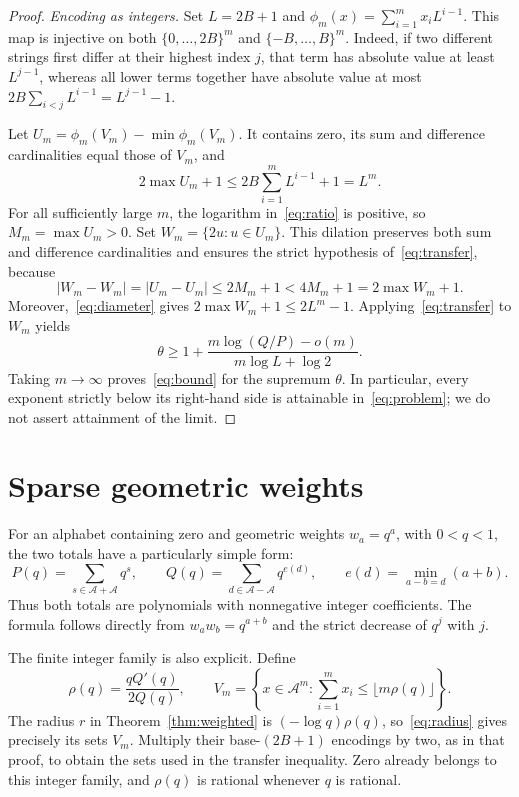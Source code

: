 \documentclass[11pt,a4paper]{article}
\newcommand{\A}{\mathcal A}
\begin{document}
\begin{proof}
\smallskip\noindent\emph{Encoding as integers.}
Set $L=2B+1$ and
$\phi_m(x)=\sum_{i=1}^m x_iL^{i-1}$. This map is injective on both
$\{0,\ldots,2B\}^m$ and $\{-B,\ldots,B\}^m$.
Indeed, if two different strings first differ at their highest index $j$,
that term has absolute value at least $L^{j-1}$, whereas all lower terms
together have absolute value at most
$2B\sum_{i<j}L^{i-1}=L^{j-1}-1$.

Let $U_m=\phi_m(V_m)-\min\phi_m(V_m)$. It contains zero, its sum and
difference cardinalities equal those of $V_m$, and
\begin{equation}\label{eq:diameter}
 2\max U_m+1
 \le 2B\sum_{i=1}^m L^{i-1}+1
 =L^m.
\end{equation}
For all sufficiently large $m$, the logarithm in~\eqref{eq:ratio} is
positive, so $M_m=\max U_m>0$. Set $W_m=\{2u:u\in U_m\}$.
This dilation preserves both sum and difference cardinalities and ensures
the strict hypothesis of~\eqref{eq:transfer}, because
\[
 |W_m-W_m|=|U_m-U_m|
 \le2M_m+1<4M_m+1=2\max W_m+1.
\]
Moreover,~\eqref{eq:diameter} gives
$2\max W_m+1\le2L^m-1$. Applying~\eqref{eq:transfer} to $W_m$ yields
\[
 \theta\ge
 1+\frac{m\log(Q/P)-o(m)}{m\log L+\log2}.
\]
Taking $m\to\infty$ proves~\eqref{eq:bound} for the supremum $\theta$.
In particular, every exponent strictly below its right-hand side is
attainable in~\eqref{eq:problem}; we do not assert attainment of the limit.
\end{proof}

\section{Sparse geometric weights}
For an alphabet containing zero and geometric weights $w_a=q^a$, with
$0<q<1$, the two totals have a
particularly simple form:
\begin{equation}\label{eq:sparse}
 P(q)=\sum_{s\in\A+\A}q^s,
 \qquad
 Q(q)=\sum_{d\in\A-\A}q^{e(d)},
 \qquad
 e(d)=\min_{a-b=d}(a+b).
\end{equation}
Thus both totals are polynomials with nonnegative integer coefficients.
The formula follows directly from $w_aw_b=q^{a+b}$ and the strict decrease
of $q^j$ with $j$.

The finite integer family is also explicit. Define
\begin{equation}\label{eq:radius}
 \rho(q)=\frac{qQ'(q)}{2Q(q)},
 \qquad
 V_m=\left\{x\in\A^m:\sum_{i=1}^m x_i\le\lfloor m\rho(q)\rfloor\right\}.
\end{equation}
The radius $r$ in Theorem~\ref{thm:weighted} is
$(-\log q)\rho(q)$, so~\eqref{eq:radius} gives precisely its sets $V_m$.
Multiply their base-$(2B+1)$ encodings by two, as in that proof, to obtain
the sets used in the transfer inequality. Zero already belongs to this
integer family, and $\rho(q)$ is rational whenever $q$ is rational.
\end{document}
